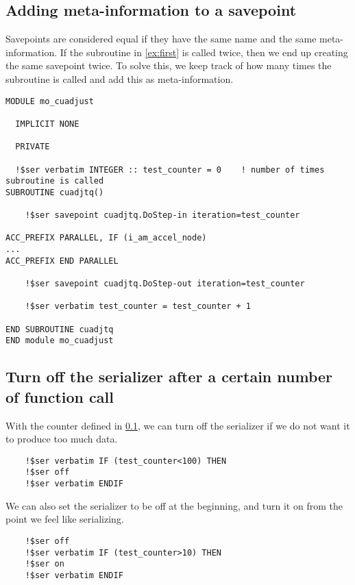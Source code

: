 \documentclass{article}
\begin{document}
\subsection{Adding meta-information to a savepoint}
\label{ex:metainfo}
Savepoints are considered equal if they have the same name and the same meta-information. If the subroutine in \ref{ex:first} is called twice, then we end up creating the same savepoint twice. To solve this, we keep track of how many times the subroutine is called and add this as meta-information.

\begin{lstlisting}
MODULE mo_cuadjust

  IMPLICIT NONE

  PRIVATE

  !$ser verbatim INTEGER :: test_counter = 0    ! number of times subroutine is called
SUBROUTINE cuadjtq()

    !$ser savepoint cuadjtq.DoStep-in iteration=test_counter

ACC_PREFIX PARALLEL, IF (i_am_accel_node) 
...
ACC_PREFIX END PARALLEL

    !$ser savepoint cuadjtq.DoStep-out iteration=test_counter

    !$ser verbatim test_counter = test_counter + 1

END SUBROUTINE cuadjtq
END module mo_cuadjust
\end{lstlisting}

\subsection{Turn off the serializer after a certain number of function call}
With the counter defined in \ref{ex:metainfo}, we can turn off the serializer if we do not want it to produce too much data.
\begin{lstlisting}
    !$ser verbatim IF (test_counter<100) THEN
    !$ser off
    !$ser verbatim ENDIF
\end{lstlisting}

We can also set the serializer to be off at the beginning, and turn it on from the point we feel like serializing.
\begin{lstlisting}
    !$ser off
    !$ser verbatim IF (test_counter>10) THEN
    !$ser on
    !$ser verbatim ENDIF
\end{lstlisting}
\end{document}
